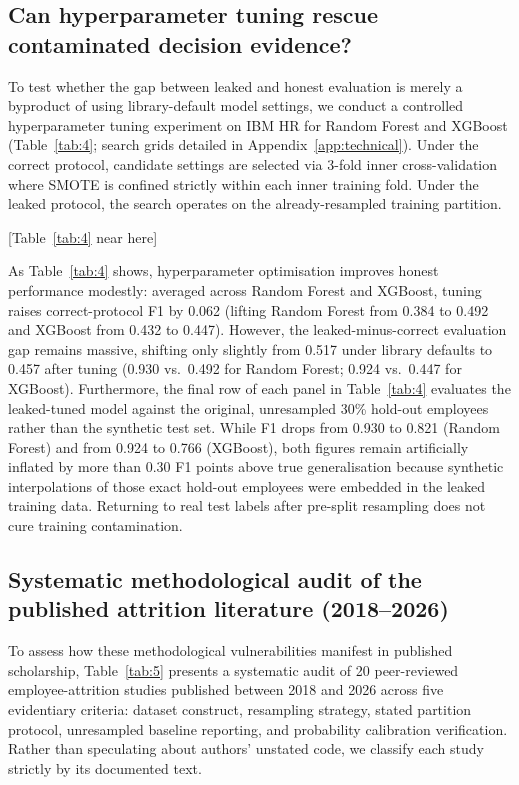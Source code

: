 \documentclass[12pt,a4paper]{article}
\begin{document}
\subsection{Can hyperparameter tuning rescue contaminated decision evidence?}
\label{sec:tuning}
To test whether the gap between leaked and honest evaluation is merely a byproduct of using library-default model settings, we conduct a controlled hyperparameter tuning experiment on IBM HR for Random Forest and XGBoost (Table~\ref{tab:4}; search grids detailed in Appendix~\ref{app:technical}). Under the correct protocol, candidate settings are selected via 3-fold inner cross-validation where SMOTE is confined strictly within each inner training fold. Under the leaked protocol, the search operates on the already-resampled training partition.

\begin{center}
[Table~\ref{tab:4} near here]
\end{center}

As Table~\ref{tab:4} shows, hyperparameter optimisation improves honest performance modestly: averaged across Random Forest and XGBoost, tuning raises correct-protocol F1 by 0.062 (lifting Random Forest from 0.384 to 0.492 and XGBoost from 0.432 to 0.447). However, the leaked-minus-correct evaluation gap remains massive, shifting only slightly from 0.517 under library defaults to 0.457 after tuning (0.930 vs.\ 0.492 for Random Forest; 0.924 vs.\ 0.447 for XGBoost). Furthermore, the final row of each panel in Table~\ref{tab:4} evaluates the leaked-tuned model against the original, unresampled 30\% hold-out employees rather than the synthetic test set. While F1 drops from 0.930 to 0.821 (Random Forest) and from 0.924 to 0.766 (XGBoost), both figures remain artificially inflated by more than 0.30 F1 points above true generalisation because synthetic interpolations of those exact hold-out employees were embedded in the leaked training data. Returning to real test labels after pre-split resampling does not cure training contamination.

\subsection{Systematic methodological audit of the published attrition literature (2018--2026)}
To assess how these methodological vulnerabilities manifest in published scholarship, Table~\ref{tab:5} presents a systematic audit of 20 peer-reviewed employee-attrition studies published between 2018 and 2026 across five evidentiary criteria: dataset construct, resampling strategy, stated partition protocol, unresampled baseline reporting, and probability calibration verification. Rather than speculating about authors' unstated code, we classify each study strictly by its documented text.
\end{document}
